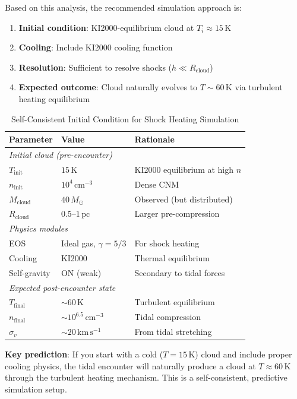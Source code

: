 \documentclass[11pt,a4paper]{article}
\newcommand{\Msun}{M_\odot}
\newcommand{\kms}{\,\mathrm{km\,s^{-1}}}
\newcommand{\pc}{\,\mathrm{pc}}
\newcommand{\cmcubed}{\,\mathrm{cm^{-3}}}
\begin{document}
Based on this analysis, the recommended simulation approach is:

\begin{enumerate}
    \item \textbf{Initial condition}: KI2000-equilibrium cloud at $T_i \approx 15\,\mathrm{K}$
    \item \textbf{Cooling}: Include KI2000 cooling function
    \item \textbf{Resolution}: Sufficient to resolve shocks ($h \ll R_\mathrm{cloud}$)
    \item \textbf{Expected outcome}: Cloud naturally evolves to $T \sim 60\,\mathrm{K}$
          via turbulent heating equilibrium
\end{enumerate}

\begin{table}[h]
\centering
\caption{Self-Consistent Initial Condition for Shock Heating Simulation}
\begin{tabular}{lll}
\toprule
\textbf{Parameter} & \textbf{Value} & \textbf{Rationale} \\
\midrule
\multicolumn{3}{l}{\textit{Initial cloud (pre-encounter)}} \\
$T_\mathrm{init}$ & $15\,\mathrm{K}$ & KI2000 equilibrium at high $n$ \\
$n_\mathrm{init}$ & $10^4\cmcubed$ & Dense CNM \\
$M_\mathrm{cloud}$ & $40\,\Msun$ & Observed (but distributed) \\
$R_\mathrm{cloud}$ & $0.5$--$1\pc$ & Larger pre-compression \\
\midrule
\multicolumn{3}{l}{\textit{Physics modules}} \\
EOS & Ideal gas, $\gamma = 5/3$ & For shock heating \\
Cooling & KI2000 & Thermal equilibrium \\
Self-gravity & ON (weak) & Secondary to tidal forces \\
\midrule
\multicolumn{3}{l}{\textit{Expected post-encounter state}} \\
$T_\mathrm{final}$ & $\sim 60\,\mathrm{K}$ & Turbulent equilibrium \\
$n_\mathrm{final}$ & $\sim 10^{6.5}\cmcubed$ & Tidal compression \\
$\sigma_v$ & $\sim 20\kms$ & From tidal stretching \\
\bottomrule
\end{tabular}
\end{table}

\textbf{Key prediction}: If you start with a cold ($T = 15\,\mathrm{K}$) cloud
and include proper cooling physics, the tidal encounter will naturally produce
a cloud at $T \approx 60\,\mathrm{K}$ through the turbulent heating mechanism.
This is a self-consistent, predictive simulation setup.
\end{document}
